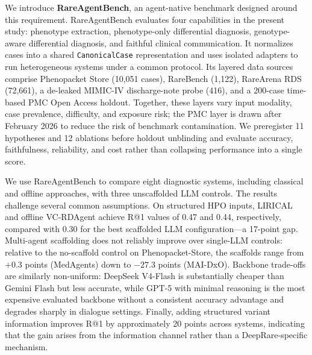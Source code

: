 \documentclass[letterpaper]{article} %
\begin{document}
We introduce \textbf{RareAgentBench}, an agent-native benchmark designed around this requirement. RareAgentBench evaluates four capabilities in the present study: phenotype extraction, phenotype-only differential diagnosis, genotype-aware differential diagnosis, and faithful clinical communication. It normalizes cases into a shared \texttt{CanonicalCase} representation and uses isolated adapters to run heterogeneous systems under a common protocol. Its layered data sources comprise Phenopacket Store (10,051 cases), RareBench (1,122), RareArena RDS (72,661), a de-leaked MIMIC-IV discharge-note probe (416), and a 200-case time-based PMC Open Access holdout. Together, these layers vary input modality, case prevalence, difficulty, and exposure risk; the PMC layer is drawn after February 2026 to reduce the risk of benchmark contamination. We preregister 11 hypotheses and 12 ablations before holdout unblinding and evaluate accuracy, faithfulness, reliability, and cost rather than collapsing performance into a single score.

We use RareAgentBench to compare eight diagnostic systems, including classical and offline approaches, with three unscaffolded LLM controls. The results challenge several common assumptions. On structured HPO inputs, LIRICAL and offline VC-RDAgent achieve R@1 values of 0.47 and 0.44, respectively, compared with 0.30 for the best scaffolded LLM configuration---a 17-point gap. Multi-agent scaffolding does not reliably improve over single-LLM controls: relative to the no-scaffold control on Phenopacket-Store, the scaffolds range from $+0.3$ points (MedAgents) down to $-27.3$ points (MAI-DxO). Backbone trade-offs are similarly non-uniform: DeepSeek V4-Flash is substantially cheaper than Gemini Flash but less accurate, while GPT-5 with minimal reasoning is the most expensive evaluated backbone without a consistent accuracy advantage and degrades sharply in dialogue settings. Finally, adding structured variant information improves R@1 by approximately 20 points across systems, indicating that the gain arises from the information channel rather than a DeepRare-specific mechanism.
\end{document}
